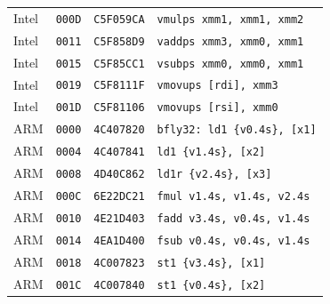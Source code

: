 \begin{table}[htbp]
\begin{tabular}{@{}l|l|l|p{7.2cm}@{}}
Intel & \texttt{000D} & \texttt{C5F059CA} & \texttt{vmulps xmm1, xmm1, xmm2} \\
Intel & \texttt{0011} & \texttt{C5F858D9} & \texttt{vaddps xmm3, xmm0, xmm1} \\
Intel & \texttt{0015} & \texttt{C5F85CC1} & \texttt{vsubps xmm0, xmm0, xmm1} \\
Intel & \texttt{0019} & \texttt{C5F8111F} & \texttt{vmovups [rdi], xmm3} \\
Intel & \texttt{001D} & \texttt{C5F81106} & \texttt{vmovups [rsi], xmm0} \\
\midrule
ARM & \texttt{0000} & \texttt{4C407820} & \texttt{bfly32: ld1 \{v0.4s\}, [x1]} \\
ARM & \texttt{0004} & \texttt{4C407841} & \texttt{ld1 \{v1.4s\}, [x2]} \\
ARM & \texttt{0008} & \texttt{4D40C862} & \texttt{ld1r \{v2.4s\}, [x3]} \\
ARM & \texttt{000C} & \texttt{6E22DC21} & \texttt{fmul v1.4s, v1.4s, v2.4s} \\
ARM & \texttt{0010} & \texttt{4E21D403} & \texttt{fadd v3.4s, v0.4s, v1.4s} \\
ARM & \texttt{0014} & \texttt{4EA1D400} & \texttt{fsub v0.4s, v0.4s, v1.4s} \\
ARM & \texttt{0018} & \texttt{4C007823} & \texttt{st1 \{v3.4s\}, [x1]} \\
ARM & \texttt{001C} & \texttt{4C007840} & \texttt{st1 \{v0.4s\}, [x2]} \\
\bottomrule
\end{tabular}
\endgroup
\end{table}
\noindent{}\par
